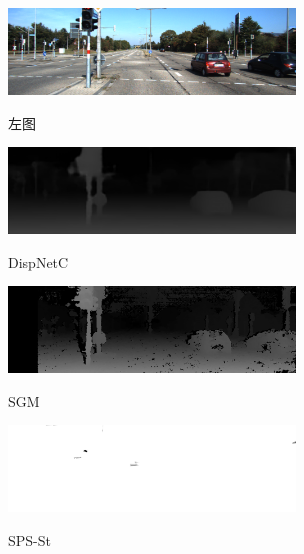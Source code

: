 \begin{figure}[!htb]
	\begin{minipage}{0.48\linewidth}
		\centerline{\includegraphics[width=3in]{figures/cmp_kitti/l_031}}
		\vspace{-10pt}
		\centerline{左图}
	\end{minipage}
	\hfill
	\begin{minipage}{0.48\linewidth}
		\centerline{\includegraphics[width=3in]{figures/cmp_kitti/pred_031}}
		\vspace{-10pt}
		\centerline{DispNetC}
	\end{minipage}
	\vfill
	\begin{minipage}{0.48\linewidth}
		\centerline{\includegraphics[width=3in]{figures/cmp_kitti/sgm_031}}
		\vspace{-10pt}
		\centerline{SGM}
	\end{minipage}
	\hfill
	\begin{minipage}{0.48\linewidth}
		\centerline{\includegraphics[width=3in]{figures/cmp_kitti/sps_031}}
		\vspace{-10pt}
		\centerline{SPS-St}
	\end{minipage}
	\begin{minipage}{0.48\linewidth}

\end{minipage}
\end{figure}
